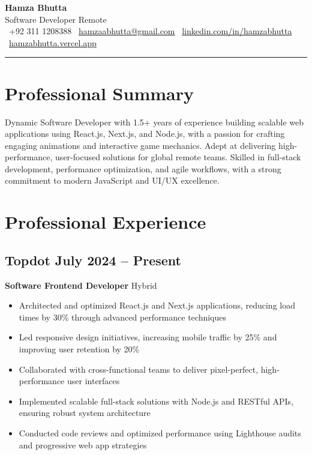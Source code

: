 \documentclass[11pt]{article}
\makeatletter
\newcommand{\resumeHeader}[4]{
    \begin{center}
        \vspace*{10pt}
        {\LARGE\bfseries\color{headercolor} #1} \\[8pt]
        {\large\color{headercolor} Software Developer \textbullet{} #2} \\[6pt]
        {\normalsize\color{headercolor}
            \faPhone~#3 \textbullet{}
            \faEnvelope~\href{mailto:hamzaabhutta@gmail.com}{hamzaabhutta@gmail.com} \textbullet{}
            \faLinkedin~\href{https://www.linkedin.com/in/hamzabhutta}{linkedin.com/in/hamzabhutta} \textbullet{}
            \faGlobe~\href{https://hamzabhutta.vercel.app/}{hamzabhutta.vercel.app}
        }
        \vspace{15pt}
        \hrule height 1pt
        \vspace{10pt}
    \end{center}
}
\makeatother
\begin{document}
\pagestyle{empty} %
\RaggedRight %

\resumeHeader{Hamza Bhutta}{Remote}{+92 311 1208388}{}

\section{Professional Summary}
Dynamic Software Developer with 1.5+ years of experience building scalable web applications using React.js, Next.js, and Node.js, with a passion for crafting engaging animations and interactive game mechanics. Adept at delivering high-performance, user-focused solutions for global remote teams. Skilled in full-stack development, performance optimization, and agile workflows, with a strong commitment to modern JavaScript and UI/UX excellence.

\section{Professional Experience}
\subsection{\texorpdfstring{Topdot \hfill July 2024 -- Present}{Topdot, July 2024 -- Present}}
\textbf{Software Frontend Developer} \hfill Hybrid
\begin{itemize}
\item Architected and optimized React.js and Next.js applications, reducing load times by 30\% through advanced performance techniques
\item Led responsive design initiatives, increasing mobile traffic by 25\% and improving user retention by 20\%
\item Collaborated with cross-functional teams to deliver pixel-perfect, high-performance user interfaces
\item Implemented scalable full-stack solutions with Node.js and RESTful APIs, ensuring robust system architecture
\item Conducted code reviews and optimized performance using Lighthouse audits and progressive web app strategies
\end{itemize}
\end{document}
